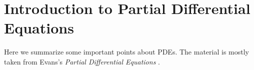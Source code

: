 \chapter{Introduction to Partial Differential Equations}
Here we summarize some important points about PDEs. The material is mostly
taken from Evans's \emph{Partial Differential Equations} \cite{evans}.


